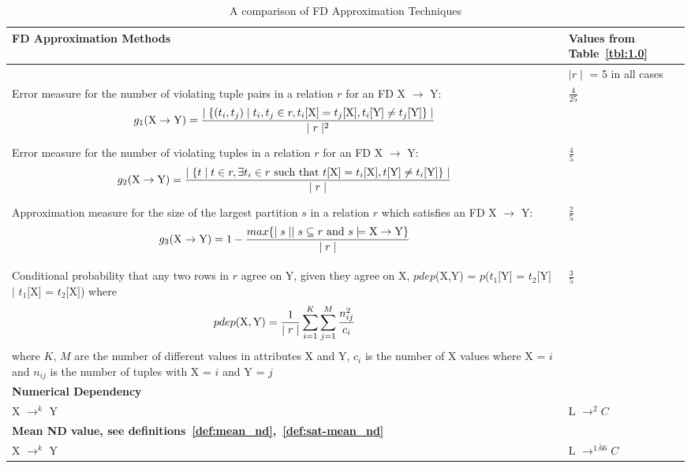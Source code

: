 {\line
\begin{table}[ht]
\begin{center}
{\footnotesize
\begin{tabular}{|p{31em}|p{10em}|} \hline 
{\bf FD Approximation Methods }  & {\bf Values from Table~\ref{tbl:1.0}}\\ \hline
{\bf \cite{km95}} & 		$\mid r \mid$ = 5 in all cases \\ \hline
Error measure for the number of violating tuple pairs in a relation
$r$ for an FD X $\to$ Y:
\[
g_1({\rm X} \to {\rm Y}) = \frac{\mid \{ (t_i,t_j) \mid t_i,t_j \in r, t_i[{\rm X}] =
t_j[{\rm X}], t_i[{\rm Y}] \not= t_j[{\rm Y}] \}\mid} {\mid r \mid^2}
\] & $\frac{4}{25}$ \\ \hline 
Error measure for the number of violating tuples in a relation
$r$ for an FD X $\to$ Y:
\[
g_2({\rm X} \to {\rm Y}) = \frac{\mid \{ t \mid t\in r, \exists t_i
\in r \mbox{ such that }  t[{\rm X}] =
t_i[{\rm X}], t[{\rm Y}] \not= t_i[{\rm Y}]  \} \mid} {\mid r \mid}
\] & $\frac{4}{5}$ \\ \hline 
Approximation measure for the size of the largest partition $s$ in a relation
$r$ which satisfies an FD X $\to$ Y:
\[
g_3({\rm X} \to {\rm Y}) = 1 - \frac{max \{ \mid s \mid \mid s \subseteq r
\mbox{ and }  s \models {\rm X} \to {\rm Y} \}}{\mid r \mid}
\] & $\frac{2}{5}$  \\ \hline

\multicolumn{2}{|p{41em}|}{\bf \cite{psm93} } \\ \hline
Conditional probability that any two rows in $r$ agree on Y, given
they agree on  
X, $pdep$(X,Y) = $p$($t_1[$Y$]$ = $t_2[$Y$]$ $\mid$ $t_1[$X$]$ =
$t_2[$X$]$) where \[ pdep({\rm X},{\rm Y}) = \frac{1}{\mid r \mid}
\sum_{i=1}^K\sum_{j=1}^M \frac{n_{ij}^2}{c_i} \]  where $K$, $M$ are
the number of different values in attributes X and Y, $c_i$ is the
number of X values where X = $i$ and $n_{ij}$ is
the number of tuples with X = $i$ and Y = $j$ & $\frac{3}{5}$  \\ \hline
\multicolumn{2}{|p{41em}|}{\bf Numerical Dependency} \\ \hline
 X $\to^k$ Y   & L $\to^2 C$  \\ \hline
\multicolumn{2}{|p{41em}|}{\bf Mean ND value, see definitions~\ref{def:mean_nd},~\ref{def:sat-mean_nd} } \\ \hline
 X $\to^k$ Y   & L $\to^{\bar{1.66}} C$  \\ \hline
\end{tabular}
}
\end{center}
\caption{\label{tbl:fd_approx} A comparison of FD Approximation Techniques }
\end{table}
}


